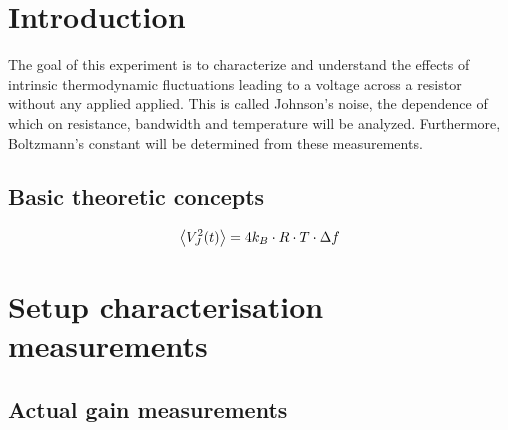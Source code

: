 \tableofcontents
\newpage
\listoffigures

\listoftables

\skippage

\setcounter{page}{1}
\restoregeometry
\thispagestyle{fancy}


\section{Introduction}

The goal of this experiment is to characterize and understand the effects of intrinsic thermodynamic fluctuations leading to a voltage across a resistor without any applied applied. This is called Johnson's noise, the dependence of which on resistance, bandwidth and temperature will be analyzed. Furthermore, Boltzmann's constant will be determined from these measurements.

\subsection{Basic theoretic concepts}


\begin{equation}\label{eq:johnson-expval}
	\expval{V_J^2(t)} = 4k_B \cdot R \cdot T \cdot \Delta f
\end{equation}

\section{Setup characterisation measurements}

\subsection{Actual gain measurements}

